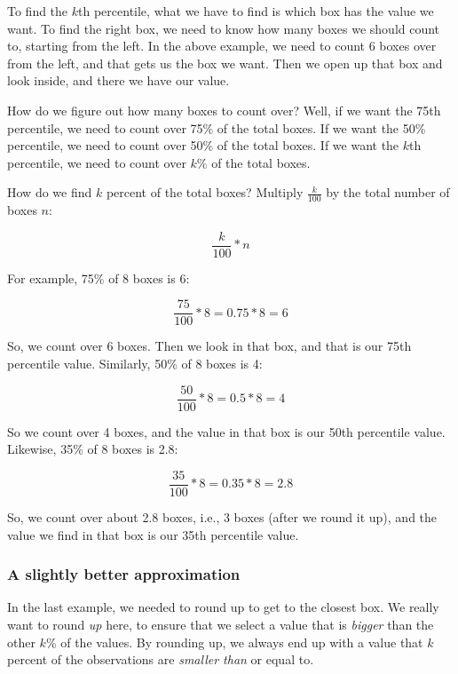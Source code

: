 \documentclass[../../../main.tex]{subfiles}
\begin{document}
To find the $k$th percentile, what we have to find is which box has the value we want. To find the right box, we need to know how many boxes we should count to, starting from the left. In the above example, we need to count 6 boxes over from the left, and that gets us the box we want. Then we open up that box and look inside, and there we have our value.

How do we figure out how many boxes to count over? Well, if we want the 75th percentile, we need to count over 75\% of the total boxes. If we want the 50\% percentile, we need to count over 50\% of the total boxes. If we want the $k$th percentile, we need to count over $k$\% of the total boxes.

How do we find $k$ percent of the total boxes? Multiply $\frac{k}{100}$ by the total number of boxes $n$:

\begin{equation*}
  \frac{k}{100} * n
\end{equation*}

\noindent
For example, 75\% of 8 boxes is 6:

\begin{equation*}
  \frac{75}{100} * 8 = 0.75 * 8 = 6
\end{equation*}

\noindent
So, we count over 6 boxes. Then we look in that box, and that is our 75th percentile value. Similarly, 50\% of 8 boxes is 4:

\begin{equation*}
  \frac{50}{100} * 8 = 0.5 * 8 = 4
\end{equation*}

\noindent
So we count over 4 boxes, and the value in that box is our 50th percentile value. Likewise, 35\% of 8 boxes is 2.8:

\begin{equation*}
  \frac{35}{100} * 8 = 0.35 * 8 = 2.8
\end{equation*}

\noindent
So, we count over about 2.8 boxes, i.e., 3 boxes (after we round it up), and the value we find in that box is our 35th percentile value.


\subsubsection{A slightly better approximation}

In the last example, we needed to round up to get to the closest box. We really want to round \emph{up} here, to ensure that we select a value that is \emph{bigger} than the other $k$\% of the values. By rounding up, we always end up with a value that $k$ percent of the observations are \emph{smaller than} or equal to.
\end{document}
